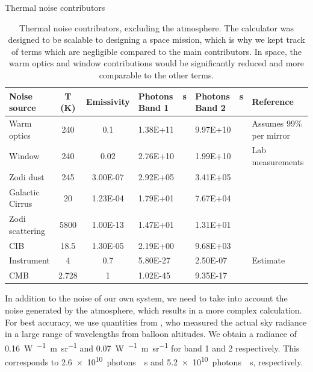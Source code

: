 \renewcommand{\arraystretch}{1.5}
\def\labelitemi{--}
\begin{table}[!h]
\small
\caption{Thermal noise contributors}
\label{tab:noiseparams}
\vspace{-0.5cm}
\begin{longtable}{P{2.5cm}ccP{2cm}P{2cm}p{3cm}}
\toprule
Noise source	&		T (K)		&		Emissivity		&		Photons~\si{\per\second} Band 1		&		Photons~\si{\per\second} Band 2		&	Reference	 \\
\midrule
Warm optics	&	\num{	240	}	&	\num{	0.1	}	&	\num{	1.38E+11	}	&	\num{	9.97E+10	}	&	Assumes 99\% per mirror	\\
Window	&	\num{	240	}	&	\num{	0.02	}	&	\num{	2.76E+10	}	&	\num{	1.99E+10	}	&	Lab measurements	\\
Zodi dust	&	\num{	245	}	&	\num{	3.00E-07	}	&	\num{	2.92E+05	}	&	\num{	3.41E+05	}	&	\cite{Fixsen:2002da}	\\
Galactic Cirrus	&	\num{	20	}	&	\num{	1.23E-04	}	&	\num{	1.79E+01	}	&	\num{	7.67E+04	}	&	\cite{Bracco:2011gw}	\\
Zodi scattering	&	\num{	5800	}	&	\num{	1.00E-13	}	&	\num{	1.47E+01	}	&	\num{	1.31E+01	}	&	\cite{Fixsen:2002da}	\\
CIB	&	\num{	18.5	}	&	\num{	1.30E-05	}	&	\num{	2.19E+00	}	&	\num{	9.68E+03	}	&	\cite{Fixsen:1998br}	\\
Instrument	&	\num{	4	}	&	\num{	0.7	}	&	\num{	5.80E-27	}	&	\num{	2.50E-07	}	&	Estimate	\\
CMB	&	\num{	2.728	}	&	\num{	1	}	&	\num{	1.02E-45	}	&	\num{	9.35E-17	}	&	\cite{Fixsen:1996di}	\\
\bottomrule
\end{longtable}
\caption*{Thermal noise contributors, excluding the atmosphere. The calculator was designed to be scalable to designing a space mission, which is why we kept track of terms which are negligible compared to the main contributors. In space, the warm optics and window contributions would be significantly reduced and more comparable to the other terms.}

\end{table}

In addition to the noise of our own system, we need to take into account the noise generated by the atmosphere, which results in a more complex calculation. For best accuracy, we use quantities from \cite{Harries:1980cva}, who measured the actual sky radiance in a large range of wavelengths from balloon altitudes. We obtain a radiance of \SI{0.16}{\watt\per{}\meter\per\steradian} and \SI{0.07}{\watt\per{}\meter\per\steradian} for band 1 and 2 respectively. This corresponds to \num{2.6e10}~photons~\si{\per\second} and \num{5.2e10}~photons~\si{\per\second}, respectively. 


